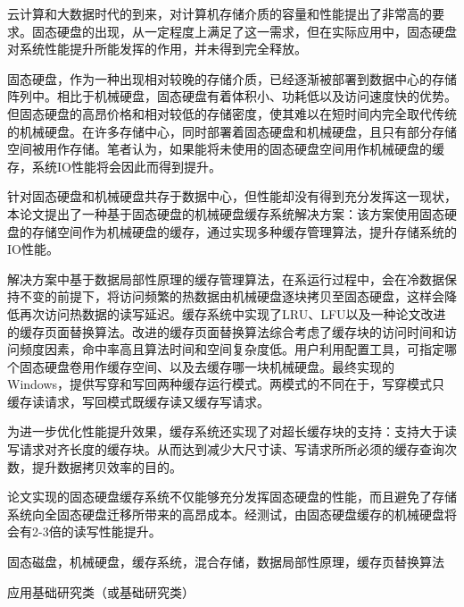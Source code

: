 
\begin{cabstract}

云计算和大数据时代的到来，对计算机存储介质的容量和性能提出了非常高的要求。固态硬盘的出现，从一定程度上满足了这一需求，但在实际应用中，固态硬盘对系统性能提升所能发挥的作用，并未得到完全释放。

固态硬盘，作为一种出现相对较晚的存储介质，已经逐渐被部署到数据中心的存储阵列中。相比于机械硬盘，固态硬盘有着体积小、功耗低以及访问速度快的优势。但固态硬盘的高昂价格和相对较低的存储密度，使其难以在短时间内完全取代传统的机械硬盘。在许多存储中心，同时部署着固态硬盘和机械硬盘，且只有部分存储空间被用作存储。笔者认为，如果能将未使用的固态硬盘空间用作机械硬盘的缓存，系统IO性能将会因此而得到提升。

针对固态硬盘和机械硬盘共存于数据中心，但性能却没有得到充分发挥这一现状，本论文提出了一种基于固态硬盘的机械硬盘缓存系统解决方案：该方案使用固态硬盘的存储空间作为机械硬盘的缓存，通过实现多种缓存管理算法，提升存储系统的IO性能。

解决方案中基于数据局部性原理的缓存管理算法，在系运行过程中，会在冷数据保持不变的前提下，将访问频繁的热数据由机械硬盘逐块拷贝至固态硬盘，这样会降低再次访问热数据的读写延迟。缓存系统中实现了LRU、LFU以及一种论文改进的缓存页面替换算法。改进的缓存页面替换算法综合考虑了缓存块的访问时间和访问频度因素，命中率高且算法时间和空间复杂度低。用户利用配置工具，可指定哪个固态硬盘卷用作缓存空间、以及去缓存哪一块机械硬盘。最终实现的Windows，提供写穿和写回两种缓存运行模式。两模式的不同在于，写穿模式只缓存读请求，写回模式既缓存读又缓存写请求。

为进一步优化性能提升效果，缓存系统还实现了对超长缓存块的支持：支持大于读写请求对齐长度的缓存块。从而达到减少大尺寸读、写请求所所必须的缓存查询次数，提升数据拷贝效率的目的。

论文实现的固态硬盘缓存系统不仅能够充分发挥固态硬盘的性能，而且避免了存储系统向全固态硬盘迁移所带来的高昂成本。经测试，由固态硬盘缓存的机械硬盘将会有2-3倍的读写性能提升。

\end{cabstract}

\begin{ckeywords}
固态磁盘，机械硬盘，缓存系统，混合存储，数据局部性原理，缓存页替换算法
\end{ckeywords}

\begin{cthesistype}
应用基础研究类（或基础研究类）
\end{cthesistype}

